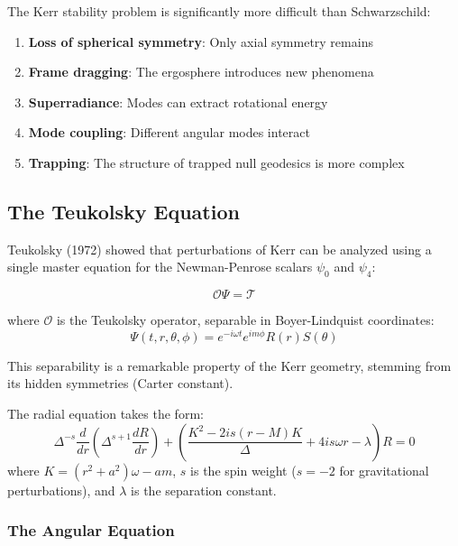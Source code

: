 \documentclass[12pt,a4paper]{article}
\begin{document}
The Kerr stability problem is significantly more difficult than Schwarzschild:

\begin{enumerate}
    \item \textbf{Loss of spherical symmetry}: Only axial symmetry remains
    \item \textbf{Frame dragging}: The ergosphere introduces new phenomena
    \item \textbf{Superradiance}: Modes can extract rotational energy
    \item \textbf{Mode coupling}: Different angular modes interact
    \item \textbf{Trapping}: The structure of trapped null geodesics is more complex
\end{enumerate}

\subsection{The Teukolsky Equation}

Teukolsky (1972) showed that perturbations of Kerr can be analyzed using a single master equation for the Newman-Penrose scalars $\psi_0$ and $\psi_4$:

\begin{equation}
\mathcal{O}\Psi = \mathcal{T}
\end{equation}

where $\mathcal{O}$ is the Teukolsky operator, separable in Boyer-Lindquist coordinates:
\begin{equation}
\Psi(t, r, \theta, \phi) = e^{-i\omega t}e^{im\phi}R(r)S(\theta)
\end{equation}

This separability is a remarkable property of the Kerr geometry, stemming from its hidden symmetries (Carter constant).

The radial equation takes the form:
\begin{equation}
\Delta^{-s}\frac{d}{dr}\left(\Delta^{s+1}\frac{dR}{dr}\right) + \left(\frac{K^2 - 2is(r-M)K}{\Delta} + 4is\omega r - \lambda\right)R = 0
\end{equation}
where $K = (r^2 + a^2)\omega - am$, $s$ is the spin weight ($s = -2$ for gravitational perturbations), and $\lambda$ is the separation constant.

\subsubsection{The Angular Equation}
\end{document}
